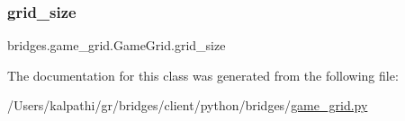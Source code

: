 \subsubsection{\texorpdfstring{grid\+\_\+size}{grid\_size}}
{\footnotesize\ttfamily bridges.\+game\+\_\+grid.\+Game\+Grid.\+grid\+\_\+size}



The documentation for this class was generated from the following file\+:\begin{DoxyCompactItemize}
\item 
/\+Users/kalpathi/gr/bridges/client/python/bridges/\mbox{\hyperlink{game__grid_8py}{game\+\_\+grid.\+py}}\end{DoxyCompactItemize}
